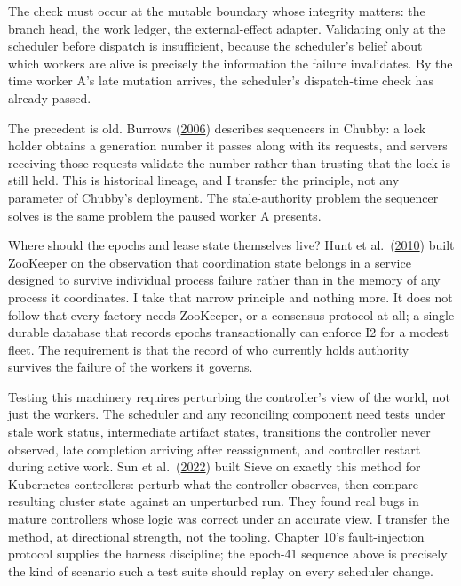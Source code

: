The check must occur at the mutable boundary whose integrity matters: the branch head, the work ledger, the external-effect adapter. Validating only at the scheduler before dispatch is insufficient, because the scheduler's belief about which workers are alive is precisely the information the failure invalidates. By the time worker A's late mutation arrives, the scheduler's dispatch-time check has already passed.

The precedent is old. Burrows (\href{https://www.usenix.org/conference/osdi-06/chubby-lock-service-loosely-coupled-distributed-systems}{2006}) describes sequencers in Chubby: a lock holder obtains a generation number it passes along with its requests, and servers receiving those requests validate the number rather than trusting that the lock is still held. This is historical lineage, and I transfer the principle, not any parameter of Chubby's deployment. The stale-authority problem the sequencer solves is the same problem the paused worker A presents.

Where should the epochs and lease state themselves live? Hunt et al.~(\href{https://www.usenix.org/conference/usenix-atc-10/zookeeper-wait-free-coordination-internet-scale-systems}{2010}) built ZooKeeper on the observation that coordination state belongs in a service designed to survive individual process failure rather than in the memory of any process it coordinates. I take that narrow principle and nothing more. It does not follow that every factory needs ZooKeeper, or a consensus protocol at all; a single durable database that records epochs transactionally can enforce I2 for a modest fleet. The requirement is that the record of who currently holds authority survives the failure of the workers it governs.

Testing this machinery requires perturbing the controller's view of the world, not just the workers. The scheduler and any reconciling component need tests under stale work status, intermediate artifact states, transitions the controller never observed, late completion arriving after reassignment, and controller restart during active work. Sun et al.~(\href{https://www.usenix.org/system/files/osdi22-sun.pdf}{2022}) built Sieve on exactly this method for Kubernetes controllers: perturb what the controller observes, then compare resulting cluster state against an unperturbed run. They found real bugs in mature controllers whose logic was correct under an accurate view. I transfer the method, at directional strength, not the tooling. Chapter 10's fault-injection protocol supplies the harness discipline; the epoch-41 sequence above is precisely the kind of scenario such a test suite should replay on every scheduler change.


